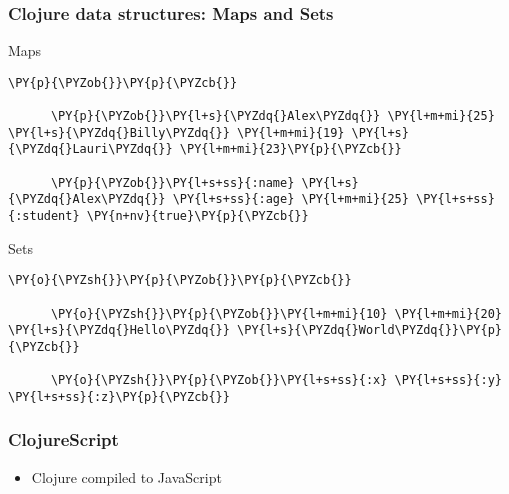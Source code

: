 \begin{frame}[fragile]
  \frametitle{Clojure data structures: Maps and Sets}

  \begin{block}{Maps}
    \begin{Verbatim}[commandchars=\\\{\}]
      \PY{p}{\PYZob{}}\PY{p}{\PYZcb{}}

      \PY{p}{\PYZob{}}\PY{l+s}{\PYZdq{}Alex\PYZdq{}} \PY{l+m+mi}{25} \PY{l+s}{\PYZdq{}Billy\PYZdq{}} \PY{l+m+mi}{19} \PY{l+s}{\PYZdq{}Lauri\PYZdq{}} \PY{l+m+mi}{23}\PY{p}{\PYZcb{}}

      \PY{p}{\PYZob{}}\PY{l+s+ss}{:name} \PY{l+s}{\PYZdq{}Alex\PYZdq{}} \PY{l+s+ss}{:age} \PY{l+m+mi}{25} \PY{l+s+ss}{:student} \PY{n+nv}{true}\PY{p}{\PYZcb{}}
    \end{Verbatim}
  \end{block}

  \begin{block}{Sets}
    \begin{Verbatim}[commandchars=\\\{\}]
      \PY{o}{\PYZsh{}}\PY{p}{\PYZob{}}\PY{p}{\PYZcb{}}

      \PY{o}{\PYZsh{}}\PY{p}{\PYZob{}}\PY{l+m+mi}{10} \PY{l+m+mi}{20} \PY{l+s}{\PYZdq{}Hello\PYZdq{}} \PY{l+s}{\PYZdq{}World\PYZdq{}}\PY{p}{\PYZcb{}}

      \PY{o}{\PYZsh{}}\PY{p}{\PYZob{}}\PY{l+s+ss}{:x} \PY{l+s+ss}{:y} \PY{l+s+ss}{:z}\PY{p}{\PYZcb{}}
    \end{Verbatim}
  \end{block}
\end{frame}





\begin{frame}
  \frametitle{ClojureScript}

  \begin{itemize}
  \item<1-> Clojure compiled to JavaScript
  \end{itemize}


\end{frame}
